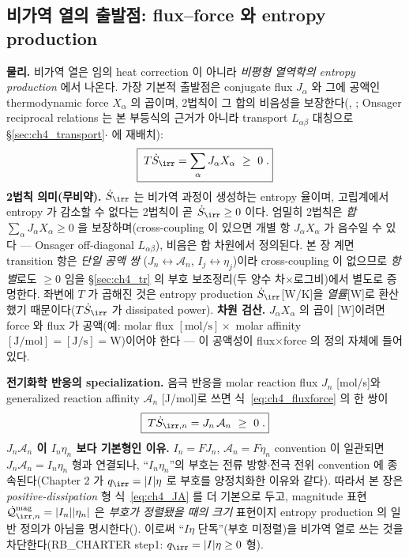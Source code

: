 \subsection{비가역 열의 출발점: flux--force 와 entropy production}\label{sec:ch4_irr}
\textbf{물리.} 비가역 열은 임의 heat correction 이 아니라 \emph{비평형 열역학의 entropy production} 에서 나온다.
가장 기본적 출발점은 conjugate flux $J_\alpha$ 와 그에 공액인 thermodynamic force $X_\alpha$ 의 곱이며, 2법칙이
그 합의 비음성을 보장한다(\cite{degrootmazur1962,prigogine1967}, ; Onsager reciprocal relations 는 본
부등식의 근거가 아니라 transport $L_{\alpha\beta}$ 대칭으로 \S\ref{sec:ch4_transport}$\cdot$ 에 재배치):
\begin{equation}
\boxed{\;T\dot S_{\irr}=\sum_\alpha J_\alpha X_\alpha\ \ge\ 0\;.}
\label{eq:ch4_fluxforce}
\end{equation}
\textbf{2법칙 의미(무비약).} $\dot S_\irr$ 는 비가역 과정이 생성하는 entropy 율이며, 고립계에서 entropy 가
감소할 수 없다는 2법칙이 곧 $\dot S_\irr\ge0$ 이다. 엄밀히 2법칙은 \emph{합} $\sum_\alpha J_\alpha X_\alpha\ge0$
을 보장하며(cross-coupling 이 있으면 개별 항 $J_\alpha X_\alpha$ 가 음수일 수 있다 — Onsager off-diagonal
$L_{\alpha\beta}$), 비음은 합 차원에서 정의된다. 본 장 계면 transition 항은 \emph{단일 공액 쌍}
($J_n\leftrightarrow\mathcal A_n$, $I_j\leftrightarrow\eta_j$)이라 cross-coupling 이 없으므로 \emph{항별}로도 $\ge0$
임을 \S\ref{sec:ch4_tr} 의 부호 보조정리(두 양수 차$\times$로그비)에서 별도로 증명한다. 좌변에 $T$ 가 곱해진
것은 entropy production $\dot S_\irr$[W/K]을 \emph{열률}[W]로 환산했기 때문이다($T\dot S_\irr$ 가 dissipated
power). \textbf{차원 검산.} $J_\alpha X_\alpha$ 의 곱이 [W]이려면 force 와 flux 가 공액(예: molar flux
$[\mathrm{mol/s}]\times$ molar affinity $[\mathrm{J/mol}]=[\mathrm{J/s}]=\mathrm W$)이어야 한다 — 이 공액성이
flux$\times$force 의 정의 자체에 들어 있다.

\textbf{전기화학 반응의 specialization.} 음극 반응을 molar reaction flux $J_n$ [mol/s]와 generalized reaction
affinity $\mathcal A_n$ [J/mol]로 쓰면 식~\eqref{eq:ch4_fluxforce} 의 한 쌍이
\begin{equation}
\boxed{\;T\dot S_{\irr,n}=J_n\,\mathcal A_n\ \ge\ 0\;.}
\label{eq:ch4_JA}
\end{equation}
\textbf{$J_n\mathcal A_n$ 이 $I_n\eta_n$ 보다 기본형인 이유.} $I_n=FJ_n$, $\mathcal A_n=F\eta_n$ convention 이
일관되면 $J_n\mathcal A_n=I_n\eta_n$ 형과 연결되나, ``$I_n\eta_n$''의 부호는 전류 방향$\cdot$전극 전위
convention 에 종속된다(Chapter 2 가 $q_\irr=|I|\eta$ 로 부호를 양정치화한 이유와 같다). 따라서 본 장은
\emph{positive-dissipation} 형 식~\eqref{eq:ch4_JA} 를 더 기본으로 두고, magnitude 표현
$\dot{\mathcal Q}_{\irr,n}^{\mathrm{mag}}=|I_n||\eta_n|$ 은 \emph{부호가 정렬됐을 때의 크기} 표현이지 entropy
production 의 일반 정의가 아님을 명시한다(). 이로써 ``$I\eta$ 단독''(부호 미정렬)을 비가역 열로 쓰는
것을 차단한다(RB\_CHARTER step1: $q_\irr=|I|\eta\ge0$ 형).


